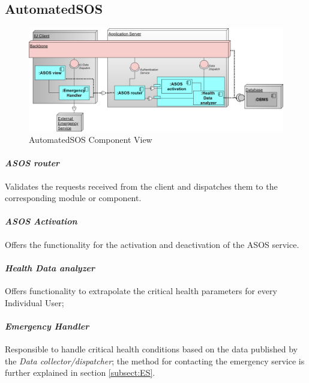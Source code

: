 \subsection{AutomatedSOS}
\label{subsect:ASOSComponentView}
\begin{figure}[H]
 \caption{AutomatedSOS Component View}
\centering
\includegraphics[width = \textwidth]{sections/architecturalDesign/ASOSDiagram.png}
\end{figure}
\paragraph{\textit{ASOS router}} Validates the requests received from the client and dispatches them to the corresponding module or component.
\paragraph{\textit{ASOS Activation}} Offers the functionality for the activation and deactivation of the ASOS service.
\paragraph{\textit{Health Data analyzer}} Offers functionality to extrapolate the critical health parameters for every Individual User;
\paragraph{\textit{Emergency Handler}} Responsible to handle critical health conditions based on the data published by the \textit{Data collector/dispatcher}; the method for contacting the emergency service is further explained in section \ref{subsect:ES}.
